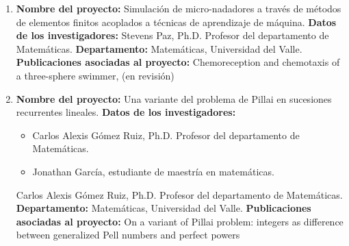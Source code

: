 \begin{spacing}{1.5}
\begin{enumerate}
    \item \textbf{Nombre del proyecto:} Simulación de micro-nadadores a
          través de métodos de elementos finitos acoplados a técnicas de aprendizaje de
          máquina. \newline
          \textbf{Datos de los investigadores:} \newline
          Stevens Paz, Ph.D. Profesor del departamento de Matemáticas. \newline
          \textbf{Departamento: } Matemáticas, Universidad del Valle. \newline
          \textbf{Publicaciones asociadas al proyecto: } \newline Chemoreception
          and chemotaxis of a three-sphere swimmer, (en revisión)\newpage

    \item \textbf{Nombre del proyecto:} Una variante del problema de Pillai en sucesiones recurrentes lineales. \newline
          \textbf{Datos de los investigadores:} \newline
          \begin{itemize}
            \item Carlos Alexis Gómez Ruiz, Ph.D. Profesor del departamento de Matemáticas.
            \item Jonathan García, estudiante de maestría en
                  matemáticas.
          \end{itemize}
          Carlos Alexis Gómez Ruiz, Ph.D. Profesor del departamento de Matemáticas. \newline
          \textbf{Departamento: } Matemáticas, Universidad del Valle. \newline
          \textbf{Publicaciones asociadas al proyecto: } \newline On a variant of Pillai problem: integers as difference between generalized Pell numbers and perfect powers \cite{Gomez2022}

  \end{enumerate}

  \mylinespacing
  \mylinespacing
  \begin{tightcenter}
  \end{tightcenter}
\end{spacing}